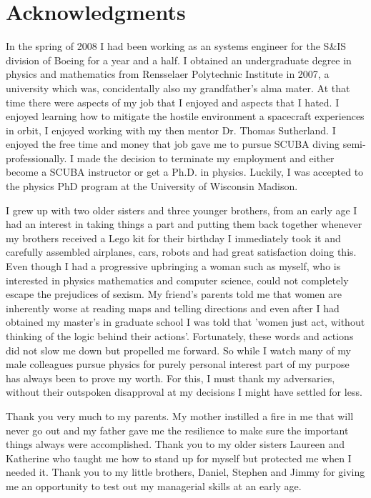 \section{Acknowledgments}
In the spring of 2008 I had been working as an systems engineer for the S&IS division
of Boeing %
for a year and a half. I obtained an undergraduate degree in physics and mathematics 
from Rensselaer Polytechnic Institute in 2007, a university which was, concidentally also
my grandfather's alma mater. At that time there were aspects
of my job that I enjoyed and aspects that I hated. I enjoyed learning how to mitigate
the hostile environment a spacecraft experiences in orbit, I enjoyed working
with my then mentor Dr. Thomas Sutherland. I enjoyed the free time
and money that job gave me to pursue SCUBA diving semi-professionally. 
I made the decision
to terminate my employment and either become a SCUBA instructor or
get a Ph.D. in physics. Luckily, I was accepted to the physics PhD program at the University of Wisconsin
Madison. 

I grew up with two older sisters and three younger brothers, from an early age I had
an interest in taking things a part and putting them back together
whenever my brothers received a Lego kit for their birthday I
immediately took it and carefully assembled airplanes, cars, robots and had great
satisfaction doing this. Even though
I had a progressive upbringing a woman such as myself, who is interested in physics
mathematics and computer science, could not completely 
escape the prejudices of sexism. My friend's parents
told me that women are inherently worse at reading maps and telling 
directions and
even after I had obtained my master's in graduate school 
I was told that 'women just act, without thinking 
of the logic behind their actions'. Fortunately, these words and actions did not 
slow me down but propelled me forward. So while I watch many of my 
male colleagues pursue physics for purely personal interest part of my
purpose has always been to prove my worth. For this, I must thank my adversaries, 
without their outspoken disapproval at my decisions I might have 
settled for less. 

Thank you very much to my parents. My mother instilled a fire in me that will never 
go out and my father gave me the resilience to make sure the important things
always were accomplished. 
Thank you to my older sisters Laureen and Katherine who taught me how to stand up 
for myself but protected me when I needed it. Thank you to my little brothers, Daniel, Stephen
and Jimmy for giving me an opportunity to test out my managerial skills at an early age.

